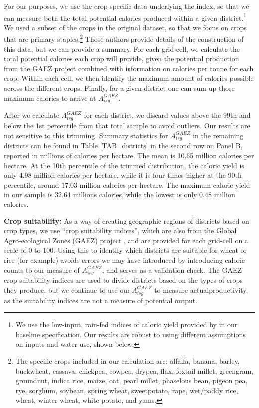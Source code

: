 \documentclass[11pt]{article}
\begin{document}
For our purposes, we use the crop-specific data underlying the \citet{galorozak2016} index, so that we can measure both the total potential calories produced within a given district.\footnote{We use the low-input, rain-fed indices of caloric yield provided by \citet{galorozak2016} in our baseline specification. Our results are robust to using different assumptions on inputs and water use, shown below.} We used a subset of the crops in the original \citet{galorozak2016} dataset, so that we focus on crops that are primary staples.\footnote{The specific crops included in our calculation are: alfalfa, banana, barley, buckwheat, cassava, chickpea, cowpea, drypea, flax, foxtail millet, greengram, groundnut, indica rice, maize, oat, pearl millet, phaselous bean, pigeon pea, rye, sorghum, soybean, spring wheat, sweetpotato, rape, wet/paddy rice, wheat, winter wheat, white potato, and yams.} Those authors provide details of the construction of this data, but we can provide a summary. For each grid-cell, we calculate the total potential calories each crop will provide, given the potential production from the GAEZ project \citep{gaez} combined with information on calories per tonne for each crop. Within each cell, we then identify the maximum amount of calories possible across the different crops. Finally, for a given district one can sum up those maximum calories to arrive at $A^{GAEZ}_{isg}$.

After we calculate $A^{GAEZ}_{isg}$ for each district, we discard values above the 99th and below the 1st percentile from that total sample to avoid outliers. Our results are not sensitive to this trimming. Summary statistics for $A^{GAEZ}_{isg}$ in the remaining districts can be found in Table \ref{TAB_districts} in the second row on Panel B, reported in millions of calories per hectare. The mean is 10.65 million calories per hectare. At the 10th percentile of the trimmed distribution, the caloric yield is only 4.98 million calories per hectare, while it is four times higher at the 90th percentile, around 17.03 million calories per hectare. The maximum caloric yield in our sample is 32.64 millions calories, while the lowest is only 0.48 million calories. 

\vspace{.5cm}\noindent\textbf{Crop suitability:} As a way of creating geographic regions of districts based on crop types, we use ``crop suitability indices'', which are also from the Global Agro-ecological Zones (GAEZ) project \citep{gaez}, and are provided for each grid-cell on a scale of 0 to 100. Using this to identify which districts are suitable for wheat or rice (for example) avoids errors we may have introduced by introducing calorie counts to our measure of $A^{GAEZ}_{isg}$, and serves as a validation check. The GAEZ crop suitability indices are used to divide districts based on the types of crops they produce, but we continue to use our $A^{GAEZ}_{isg}$ to measure actualproductivity, as the suitability indices are not a measure of potential output.
\end{document}
